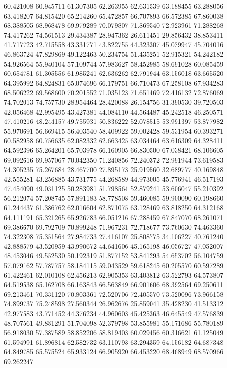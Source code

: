 60.421008
60.945711
61.307305
62.263955
62.631539
63.188455
63.288056
63.418207
64.815420
65.214260
65.472857
66.707893
66.572385
67.860038
68.388505
68.968478
69.979289
70.079807
71.869540
72.923961
71.288268
74.417262
74.561513
29.434387
28.947362
26.611451
29.856432
38.853411
41.717723
42.715558
43.331771
43.822755
44.323307
45.039947
45.704016
46.863724
47.829869
49.122463
50.234754
51.435251
52.915321
54.242182
54.926564
55.940104
57.109744
57.983627
58.452985
58.691028
60.085459
60.654781
61.305556
61.985241
62.636262
62.791944
63.156018
63.665520
64.395992
64.824831
65.074696
66.179751
66.710473
67.258108
67.934283
68.506222
69.568600
70.201552
71.035123
71.651469
72.416132
72.876069
74.702013
74.757730
28.954464
28.420088
26.154756
31.390530
39.720503
42.056468
42.995495
43.427381
44.084110
44.564487
45.242518
46.250571
47.410216
48.244157
49.755931
50.836222
52.078515
53.991397
53.877982
55.970691
56.669415
56.403540
58.409922
59.002428
59.531954
60.393271
60.582958
60.756635
62.082332
62.663425
63.034464
63.616309
64.328411
64.592396
65.264201
65.703978
66.160905
66.830500
67.038421
68.106605
69.092616
69.957067
70.042350
71.240856
72.240372
72.991944
73.619583
74.305235
75.267684
28.467700
27.895173
25.919560
32.689777
40.169848
42.555281
43.256885
43.731775
44.268589
44.973005
45.776941
46.517193
47.454090
49.031125
50.283981
51.798564
52.879241
53.606047
55.210392
56.212074
57.208745
57.891183
58.778508
59.460085
59.900090
60.198660
61.244437
61.386762
62.016604
62.871075
63.128469
63.818250
64.312168
64.111191
65.321265
65.926783
66.051216
67.288459
67.847070
68.261071
69.386670
69.792709
70.899248
71.967231
72.718677
73.760630
74.463360
74.322308
75.351564
27.984733
27.416107
25.808775
34.106227
40.761240
42.888579
43.520959
43.990672
44.641606
45.165198
46.056727
47.052007
48.453046
49.552530
50.192319
51.877152
53.841293
54.653702
56.104759
57.079162
57.787757
58.184115
59.043529
59.618245
60.205570
60.597289
61.422461
62.010108
62.456213
62.905353
63.403812
63.522793
64.573807
64.519538
65.162708
66.163843
66.563849
66.901606
68.392564
69.250611
69.213461
70.331120
70.803361
72.520706
72.405570
73.520096
73.966158
74.899737
75.248598
27.560344
26.962676
25.859041
35.428230
41.513312
42.977583
43.771452
44.376234
44.960603
45.425363
46.645549
47.576839
48.707561
49.881291
51.704098
52.379798
53.855981
55.171686
55.780189
56.918030
57.387589
58.852206
58.819403
60.029456
60.316621
61.125049
61.594991
61.896814
62.582732
63.110793
63.294359
64.156182
64.687348
64.849785
65.575524
65.933124
66.905920
66.453220
68.468949
68.570966
69.262247
